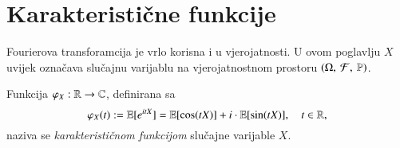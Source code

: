 
\chapter{Karakteristi\v cne funkcije}

Fourierova transforamcija je vrlo korisna i u vjerojatnosti.
U ovom poglavlju $X$ uvijek ozna\v cava slu\v cajnu varijablu na vjerojatnostnom prostoru $(\Omega, \: \mathcal{F}, \: \mathbb{P})$.

\begin{defn}    \label{def:17.1}
    Funkcija $\varphi_X :  \mathbb{R} \to \mathbb{C}$, definirana sa
    \begin{equation*}
        \varphi_X (t) := \mathbb{E} [e^{itX}] = \mathbb{E}[\cos (tX)] + i \cdot \mathbb{E} [ \sin (tX) ], \quad t \in \mathbb{R},
    \end{equation*}
    naziva se \emph{karakteristi\v cnom funkcijom} slu\v cajne varijable $X$.
\end{defn}